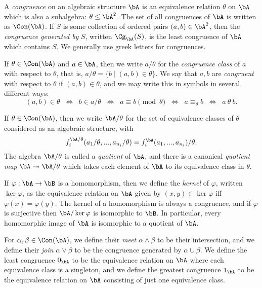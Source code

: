 \begin{defn} A \emph{congruence} on an algebraic structure $\bA$ is an equivalence relation $\theta$ on $\bA$ which is also a subalgebra: $\theta \le \bA^2$. The set of all congruences of $\bA$ is written as $\Con(\bA)$. If $S$ is some collection of ordered pairs $(a,b) \in \bA^2$, then the \emph{congruence generated by} $S$, written $\Cg_\bA(S)$, is the least congruence of $\bA$ which contains $S$. We generally use greek letters for congruences.

If $\theta \in \Con(\bA)$ and $a \in \bA$, then we write $a/\theta$ for the \emph{congruence class} of $a$ with respect to $\theta$, that is, $a/\theta = \{b \mid (a,b) \in \theta\}$. We say that $a,b$ are \emph{congruent} with respect to $\theta$ if $(a,b) \in \theta$, and we may write this in symbols in several different ways:
\[
(a,b) \in \theta \;\; \iff \;\; b \in a/\theta \;\; \iff \;\; a \equiv b \pmod{\theta} \;\; \iff \;\; a \equiv_\theta b \;\; \iff \;\; a\ \theta\ b.
\]

If $\theta \in \Con(\bA)$, then we write $\bA/\theta$ for the set of equivalence classes of $\theta$ considered as an algebraic structure, with
\[
f_i^{\bA/\theta}(a_1/\theta, ..., a_{n_i}/\theta) = f_i^\bA(a_1, ..., a_{n_i})/\theta.
\]
The algebra $\bA/\theta$ is called a \emph{quotient} of $\bA$, and there is a canonical \emph{quotient map} $\bA \twoheadrightarrow \bA/\theta$ which takes each element of $\bA$ to its equivalence class in $\theta$.

If $\varphi : \bA \rightarrow \bB$ is a homomorphism, then we define the \emph{kernel} of $\varphi$, written $\ker \varphi$, as the equivalence relation on $\bA$ given by $(x,y) \in \ker \varphi$ iff $\varphi(x) = \varphi(y)$. The kernel of a homomorphism is always a congruence, and if $\varphi$ is surjective then $\bA/\ker \varphi$ is isomorphic to $\bB$. In particular, every homomorphic image of $\bA$ is isomorphic to a quotient of $\bA$.

For $\alpha, \beta \in \Con(\bA)$, we define their \emph{meet} $\alpha \wedge \beta$ to be their intersection, and we define their \emph{join} $\alpha \vee \beta$ to be the congruence generated by $\alpha \cup \beta$. We define the least congruence $0_\bA$ to be the equivalence relation on $\bA$ where each equivalence class is a singleton, and we define the greatest congruence $1_\bA$ to be the equivalence relation on $\bA$ consisting of just one equivalence class.
\end{defn}


